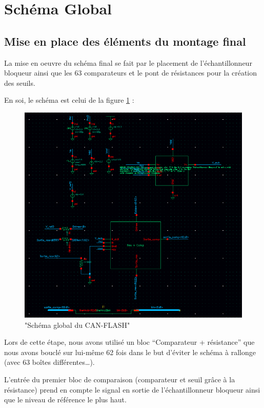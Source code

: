 \documentclass[11pt]{article}
\begin{document}
\clearpage


\section{Sch\'ema Global}
\subsection{Mise en place des \'el\'ements du montage final}
La mise en oeuvre du sch\'ema final se fait par le placement de l'\'echantillonneur bloqueur
ainsi que les 63 comparateurs et le pont de r\'esistances pour la cr\'eation des seuils.

En soi, le sch\'ema est celui de la figure \ref{fig:schemaGlobal} :

\begin{figure}[!htb]
\begin{center}
  \includegraphics[scale=0.60]{schema_final.png}
  \caption{"Sch\'ema global du CAN-FLASH"}
  \label{fig:schemaGlobal}
\end{center}
\end{figure}

Lors de cette \'etape, nous avons utilis\'e un bloc ``Comparateur + r\'esistance'' que nous avons boucl\'e
sur lui-m\^eme 62 fois dans le but d'\'eviter le sch\'ema \`a rallonge (avec 63 bo\^ites diff\'erentes…).

L'entr\'ee du premier bloc de comparaison (comparateur et seuil gr\^ace \`a la r\'esistance) prend en compte
le signal en sortie de l'\'echantillonneur bloqueur ainsi que le niveau de r\'ef\'erence le plus haut.
\end{document}
